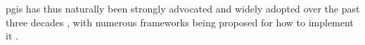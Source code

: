 \documentclass[notitlepage]{article}
\begin{document}
\ac{pgis} has thus naturally been strongly advocated and widely adopted over the past three decades \cite{drummondFutureGISPlanning2008}, with numerous frameworks being proposed for how to implement it \cite{brommelstroetPlanningSupportSystems2010}. 

%


\end{document}
